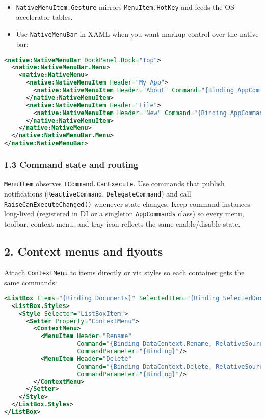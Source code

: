 \begin{itemize}
\tightlist
\item
  \passthrough{\lstinline!NativeMenuItem.Gesture!} mirrors
  \passthrough{\lstinline!MenuItem.HotKey!} and feeds the OS accelerator
  tables.
\item
  Use \passthrough{\lstinline!NativeMenuBar!} in XAML when you want
  markup control over the native bar:
\end{itemize}

\begin{lstlisting}[language=XML]
<native:NativeMenuBar DockPanel.Dock="Top">
  <native:NativeMenuBar.Menu>
    <native:NativeMenu>
      <native:NativeMenuItem Header="My App">
        <native:NativeMenuItem Header="About" Command="{Binding AppCommands.ShowAbout}"/>
      </native:NativeMenuItem>
      <native:NativeMenuItem Header="File">
        <native:NativeMenuItem Header="New" Command="{Binding AppCommands.New}"/>
      </native:NativeMenuItem>
    </native:NativeMenu>
  </native:NativeMenuBar.Menu>
</native:NativeMenuBar>
\end{lstlisting}

\subsubsection{1.3 Command state and
routing}\label{command-state-and-routing}

\passthrough{\lstinline!MenuItem!} observes
\passthrough{\lstinline!ICommand.CanExecute!}. Use commands that publish
notifications (\passthrough{\lstinline!ReactiveCommand!},
\passthrough{\lstinline!DelegateCommand!}) and call
\passthrough{\lstinline!RaiseCanExecuteChanged()!} whenever state
changes. Keep command instances long-lived (registered in DI or a
singleton \passthrough{\lstinline!AppCommands!} class) so every menu,
toolbar, context menu, and tray icon reflects the same enable/disable
state.

\subsection{2. Context menus and
flyouts}\label{context-menus-and-flyouts}

Attach \passthrough{\lstinline!ContextMenu!} to items directly or via
styles so each container gets the same commands:

\begin{lstlisting}[language=XML]
<ListBox Items="{Binding Documents}" SelectedItem="{Binding SelectedDocument}">
  <ListBox.Styles>
    <Style Selector="ListBoxItem">
      <Setter Property="ContextMenu">
        <ContextMenu>
          <MenuItem Header="Rename"
                    Command="{Binding DataContext.Rename, RelativeSource={RelativeSource AncestorType=ListBox}}"
                    CommandParameter="{Binding}"/>
          <MenuItem Header="Delete"
                    Command="{Binding DataContext.Delete, RelativeSource={RelativeSource AncestorType=ListBox}}"
                    CommandParameter="{Binding}"/>
        </ContextMenu>
      </Setter>
    </Style>
  </ListBox.Styles>
</ListBox>
\end{lstlisting}

